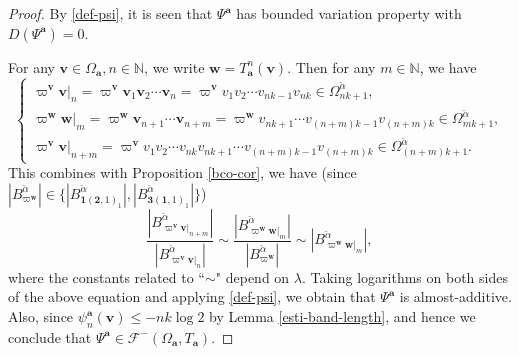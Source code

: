 \documentclass[reqno,11pt,graphicx,]{amsart}
\numberwithin{equation}{section}
\theoremstyle{plain}
\newcommand{\N}{{\mathbb N}}
\newcommand{\3}{\mathbf{3}}
\newcommand{\ma}{\mathbf{a}}
\newcommand{\mv}{\mathbf{v}}
\begin{document}
	\begin{proof}
		By \eqref{def-psi}, it is seen that $\Psi^{\ma}$ has bounded variation property with $D(\Psi^{\ma})=0$.
		
		For any $\mv\in\Omega_{\ma},n\in\N$, we write %
		$\mathbf{w}=T_{\mathbf{a}}^n(\mv)$. 
		Then for any $m\in\N$, we have
		\begin{equation*}
			\begin{cases}
				\varpi^{\mv}\mv|_{n}=\varpi^{\mv}\mv_{1}\mv_{2}\cdots\mv_{n}=\varpi^{\mv}v_1v_2\cdots v_{nk-1}v_{nk}\in\Omega^{\check{\alpha}}_{nk+1},\\
				\varpi^{\mathbf{w}}\mathbf{w}|_{m}=\varpi^{\mathbf{w}}\mv_{n+1}\cdots\mv_{n+m}=\varpi^{\mathbf{w}}v_{nk+1}\cdots v_{(n+m)k-1}v_{(n+m)k}\in\Omega^{\check{\alpha}}_{mk+1},\\
				\varpi^{\mv}\mv|_{n+m}=\varpi^{\mv}v_1v_2\cdots v_{nk}v_{nk+1}\cdots v_{(n+m)k-1}v_{(n+m)k}\in\Omega^{\check{\alpha}}_{(n+m)k+1}.
			\end{cases}
		\end{equation*}
		This combines with Proposition \ref{bco-cor},  we have (since $|B^{\check{\alpha}}_{\varpi^{\mathbf{w}}}|\in\{|B^{\check{\alpha}}_{\mathbf{1}(\mathbf{2},1)_{1}}|,|B^{\check{\alpha}}_{\mathbf{3}(\mathbf{1},1)_{1}}|\}$)
		$$ \frac{|B^{\check{\alpha}}_{\varpi^{\mv}\mv|_{n+m}}|}
		{|B^{\check{\alpha}}_{\varpi^{\mv}\mv|_n}|}\sim
		\frac{|B_{\varpi^{\mathbf{w}}\mathbf{w}|_m}^{\check{\alpha}}|}{|B_{\varpi^{\mathbf{w}}}^{\check{\alpha}}|}\sim|B_{\varpi^{\mathbf{w}}\mathbf{w}|_m}^{\check{\alpha}}|,$$
		where the constants related to ``$\sim$" depend on $\lambda$. Taking logarithms on both sides of the above equation and applying \eqref{def-psi}, we obtain that $\Psi^{\ma}$ is almost-additive. Also, since $\psi^{\ma}_n(\mv)\leq-nk\log2$ by Lemma \ref{esti-band-length}, and hence we conclude that $\Psi^{\ma}\in \mathcal F^-(\Omega_{\ma},T_{\ma}).$
		

\end{proof}
\end{document}

